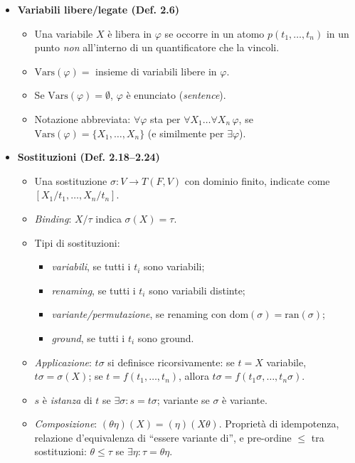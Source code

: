\documentclass[12pt]{article}
\begin{document}
\begin{itemize}
  \item \textbf{Variabili libere/legate (Def. 2.6)}
    \begin{itemize}
      \item Una variabile $X$ è libera in $\varphi$ se occorre in un atomo $p(t_1,\dots,t_n)$ in un punto \emph{non} all’interno di un quantificatore che la vincoli.
      \item $\mathrm{Vars}(\varphi) =$ insieme di variabili libere in $\varphi$.
      \item Se $\mathrm{Vars}(\varphi)=\emptyset$, $\varphi$ è enunciato (\emph{sentence}).
      \item Notazione abbreviata: $\forall \varphi$ sta per $\forall X_1\dots \forall X_n\,\varphi$, se $\mathrm{Vars}(\varphi)=\{X_1,\dots,X_n\}$ (e similmente per $\exists\varphi$).
    \end{itemize}

  \item \textbf{Sostituzioni (Def. 2.18–2.24)}
    \begin{itemize}
      \item Una sostituzione $\sigma: V \to T(F,V)$ con dominio finito, indicate come $[X_1/t_1,\dots,X_n/t_n]$.
      \item \emph{Binding}: $X/\tau$ indica $\sigma(X)=\tau$.
      \item Tipi di sostituzioni:
        \begin{itemize}
          \item \emph{variabili}, se tutti i $t_i$ sono variabili;
          \item \emph{renaming}, se tutti i $t_i$ sono variabili distinte;
          \item \emph{variante/permutazione}, se renaming con $\mathrm{dom}(\sigma)=\mathrm{ran}(\sigma)$;
          \item \emph{ground}, se tutti i $t_i$ sono ground.
        \end{itemize}
      \item \emph{Applicazione}: $t\sigma$ si definisce ricorsivamente: se $t=X$ variabile, $t\sigma=\sigma(X)$; se $t=f(t_1,\dots,t_n)$, allora $t\sigma = f(t_1\sigma, \dots, t_n\sigma)$.
      \item $s$ è \emph{istanza} di $t$ se $\exists\sigma: s = t\sigma$; variante se $\sigma$ è variante.
      \item \emph{Composizione}: $(\theta\eta)(X) = (\eta)(X\theta)$. Proprietà di idempotenza, relazione d’equivalenza di ``essere variante di'', e pre-ordine $\leq$ tra sostituzioni: $\theta \leq \tau$ se $\exists \eta: \tau = \theta \eta$.
    \end{itemize}
\end{itemize}
\end{document}
